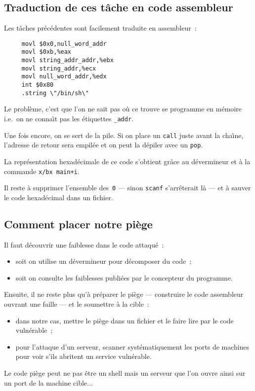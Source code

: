 \begin{frame}
  \section{Traduction de ces t\^ache en code assembleur}%
  Les t\^aches pr\'ec\'edentes sont facilement traduite en assembleur~:
\begin{verbatim}
     movl $0x0,null_word_addr
     movl $0xb,%eax 
     movl string_addr_addr,%ebx
     movl string_addr,%ecx
     movl null_word_addr,%edx
     int $0x80
     .string \"/bin/sh\" 
\end{verbatim}
  Le probl\`eme, c'est que l'on ne sait pas o\`u ce trouve se
  programme en m\'emoire i.e.\ on ne conna\^\i{}t pas les \'etiquettes
  \texttt{\_addr}.
  \par
  Une fois encore, on se sert de la pile. Si on place un \texttt{call}
  juste avant la cha\^\i{}ne, l'adresse de retour sera empil\'ee et on
  peut la d\'epiler avec un \texttt{pop}.
  \par
  La repr\'esentation  hexad\'ecimale  de ce code  s'obtient gr\^ace au
  d\'evermineur et \`a la commande \texttt{x/bx main+i}.
  \par
  Il    reste  \`a   supprimer  l'ensemble  des~\texttt{0}   --- sinon
  \texttt{scanf} s'arr\^eterait   l\`a  ---  et  \`a  sauver  le  code
  hexad\'ecimal dans un fichier.
\end{frame}
\begin{frame}
  \section{Comment placer notre pi\`ege}%
  Il faut d\'ecouvrir une faiblesse dans le code attaqu\'e~:
  \begin{itemize}
  \item soit on utilise un d\'evermineur pour d\'ecomposer du code~;
  \item soit on consulte  les faiblesses publi\'ees par  le concepteur
    du programme.
  \end{itemize}
  \par\medskip
  Ensuite,    il ne  reste  plus    qu'\`a  pr\'eparer  le pi\`ege ---
  construire le code assembleur ouvrant une faille --- et le soumettre
  \`a la cible~:
  \begin{itemize}
  \item dans notre cas, mettre le pi\`ege  dans un fichier et le faire
    lire par le code vuln\'erable~;
  \item  pour  l'attaque d'un serveur, scanner  syst\'ematiquement les
    ports  de  machines   pour   voir   s'ils  abritent  un    service
    vuln\'erable.
  \end{itemize}
  \par\medskip
  Le code pi\`ege peut ne pas \^etre un shell mais un serveur que l'on
  ouvre ainsi sur un port de la machine cible...
\end{frame}

